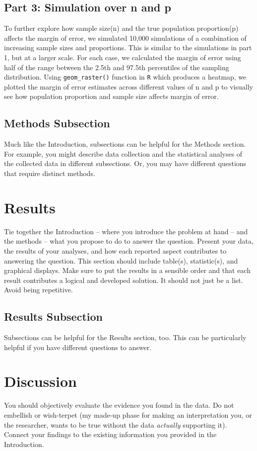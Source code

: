 \documentclass{article}\usepackage[]{graphicx}\usepackage[]{xcolor}
\begin{document}
\begin{multicols}{2}
\subsection{Part 3: Simulation over n and p}

To further explore how sample size(n) and the true population proportion(p) affects the margin of error, we simulated 10,000 simulations of a combination of increasing sample sizes and proportions. This is similar to the simulations in part 1, but at a larger scale. For each case, we calculated the margin of error using half of the range between the 2.5th and 97.5th percentiles of the sampling distribution. Using \texttt{geom\_raster()} function in \texttt{R} which produces a heatmap, we plotted the margin of error estimates across different values of n and p to visually see how population proportion and sample size affects margin of error.

\subsection{Methods Subsection}
Much like the Introduction, subsections can be helpful for the Methods section. For example, you might describe data collection and the statistical analyses of the collected data in different subsections. Or, you may have different questions that require distinct methods. 

\section{Results}
Tie together the Introduction -- where you introduce the problem at hand -- and the methods --  what you propose to do to answer the question. Present your data, the results of your analyses, and how each reported aspect contributes to answering the question. This section should include table(s), statistic(s), and graphical displays. Make sure to put the results in a sensible order and that each result contributes a logical and developed solution. It should not just be a list. Avoid being repetitive. 

\subsection{Results Subsection}
Subsections can be helpful for the Results section, too. This can be particularly helpful if you have different questions to answer. 


\section{Discussion}
 You should objectively evaluate the evidence you found in the data. Do not embellish or wish-terpet (my made-up phase for making an interpretation you, or the researcher, wants to be true without the data \emph{actually} supporting it). Connect your findings to the existing information you provided in the Introduction.


\end{multicols}
\end{document}
